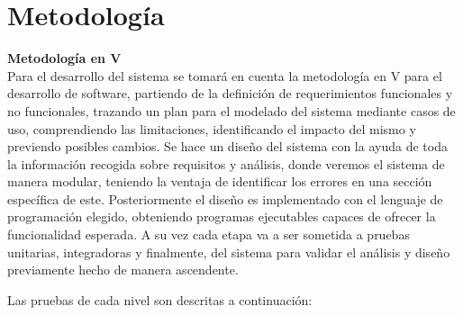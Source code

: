 \section{Metodología}

\textbf{Metodología en V}\\
Para el desarrollo del sistema se tomará en cuenta la metodología en V para el desarrollo de software, partiendo de la definición de requerimientos funcionales y no funcionales, trazando un plan para el modelado del sistema mediante casos de uso, comprendiendo las limitaciones, identificando el impacto del mismo y previendo posibles cambios. Se hace un diseño del sistema con la ayuda de toda la información recogida sobre requisitos y análisis, donde veremos el sistema de manera modular, teniendo la ventaja de identificar los errores en una sección específica de este. Posteriormente el diseño es implementado con el lenguaje de programación elegido, obteniendo programas ejecutables capaces de ofrecer la funcionalidad esperada. A su vez cada etapa va a ser sometida a pruebas unitarias, integradoras y finalmente, del sistema para validar el análisis y diseño previamente hecho de manera ascendente.

Las pruebas de cada nivel son descritas a continuación:

